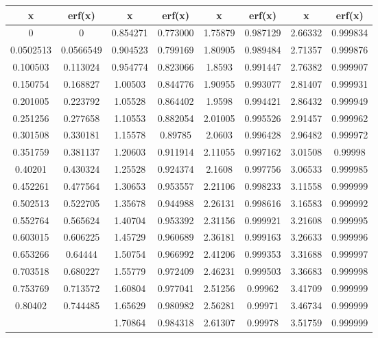 \documentclass[12pt,a4paper]{article}
\begin{document}
\begin{table}[H]
\centering
\small
\begin{tabular}{|c|c|c|c|c|c|c|c|}
\hline
x & erf(x) & x & erf(x) & x & erf(x) & x & erf(x) \\
\hline
0 & 0 & 0.854271 & 0.773000 & 1.75879 & 0.987129 & 2.66332 & 0.999834 \\
0.0502513 & 0.0566549 & 0.904523 & 0.799169 & 1.80905 & 0.989484 & 2.71357 & 0.999876 \\
0.100503 & 0.113024 & 0.954774 & 0.823066 & 1.8593 & 0.991447 & 2.76382 & 0.999907 \\
0.150754 & 0.168827 & 1.00503 & 0.844776 & 1.90955 & 0.993077 & 2.81407 & 0.999931 \\
0.201005 & 0.223792 & 1.05528 & 0.864402 & 1.9598 & 0.994421 & 2.86432 & 0.999949 \\
0.251256 & 0.277658 & 1.10553 & 0.882054 & 2.01005 & 0.995526 & 2.91457 & 0.999962 \\
0.301508 & 0.330181 & 1.15578 & 0.89785 & 2.0603 & 0.996428 & 2.96482 & 0.999972 \\
0.351759 & 0.381137 & 1.20603 & 0.911914 & 2.11055 & 0.997162 & 3.01508 & 0.99998 \\
0.40201 & 0.430324 & 1.25528 & 0.924374 & 2.1608 & 0.997756 & 3.06533 & 0.999985 \\
0.452261 & 0.477564 & 1.30653 & 0.953557 & 2.21106 & 0.998233 & 3.11558 & 0.999999 \\
0.502513 & 0.522705 & 1.35678 & 0.944988 & 2.26131 & 0.998616 & 3.16583 & 0.999992 \\
0.552764 & 0.565624 & 1.40704 & 0.953392 & 2.31156 & 0.999921 & 3.21608 & 0.999995 \\
0.603015 & 0.606225 & 1.45729 & 0.960689 & 2.36181 & 0.999163 & 3.26633 & 0.999996 \\
0.653266 & 0.64444 & 1.50754 & 0.966992 & 2.41206 & 0.999353 & 3.31688 & 0.999997 \\
0.703518 & 0.680227 & 1.55779 & 0.972409 & 2.46231 & 0.999503 & 3.36683 & 0.999998 \\
0.753769 & 0.713572 & 1.60804 & 0.977041 & 2.51256 & 0.99962 & 3.41709 & 0.999999 \\
0.80402 & 0.744485 & 1.65629 & 0.980982 & 2.56281 & 0.99971 & 3.46734 & 0.999999 \\
& & 1.70864 & 0.984318 & 2.61307 & 0.99978 & 3.51759 & 0.999999 \\
\hline
\end{tabular}
\end{table}
\end{document}
